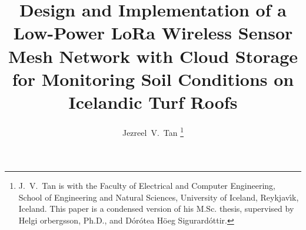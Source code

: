 \documentclass[journal,a4paper]{IEEEtran}
\begin{document}
\renewcommand{\figurename}{Fig.}

\title{Design and Implementation of a Low-Power LoRa Wireless Sensor Mesh Network with Cloud Storage for Monitoring Soil Conditions on Icelandic Turf Roofs}

\author{Jezreel~V.~Tan%
  \thanks{J.~V.~Tan is with the Faculty of Electrical and Computer Engineering, School of Engineering and Natural Sciences, University of Iceland, Reykjav{\'\i}k, Iceland. This paper is a condensed version of his M.Sc. thesis, supervised by Helgi {\TH}orbergsson, Ph.D., and D{\'o}r{\'o}tea H{\"o}eg Sigur{\dh}ard{\'o}ttir.}}


\maketitle










\printbibliography[title={References}]
\end{document}
